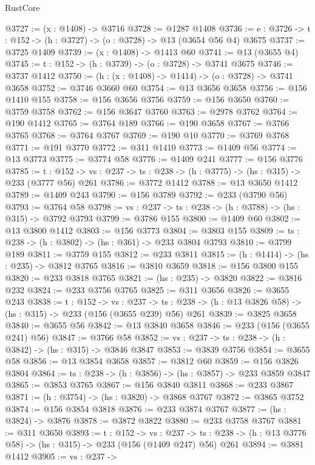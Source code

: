 \begin{lexlean}{RustCore}
\begin{coremodule}
@3727 := (x : @1408) -> @3716
@3728 := @1287 @1408
@3736 := {e : @3726} -> {t : @152} -> (h : @3727) -> (o : @3728) -> @13 (@3654 @56 @4) @3675
@3737 := @3725 @1409
@3739 := (x : @1408) -> @1413 @60
@3741 := @13 (@3655 @4)
@3745 := {t : @152} -> (h : @3739) -> (o : @3728) -> @3741 @3675
@3746 := @3737 @1412
@3750 := (h : (x : @1408) -> @1414) -> (o : @3728) -> @3741 @3658
@3752 := @3746 @3660 @60
@3754 := @13 @3656 @3658
@3756 := @156 @1410 @155
@3758 := @156 @3656 @3756
@3759 := @156 @3650
@3760 := @3759 @3758
@3762 := @156 @3647 @3760
@3763 := @2978 @3762
@3764 := @190 @1412
@3765 := @3764 @189
@3766 := @190 @3658
@3767 := @3766 @3765
@3768 := @3764 @3767
@3769 := @190 @10
@3770 := @3769 @3768
@3771 := @191 @3770
@3772 := @311 @1410
@3773 := @1409 @56
@3774 := @13 @3773
@3775 := @3774 @58
@3776 := @1409 @241
@3777 := @156 @3776
@3785 := {t : @152} ->
  {vs : @237} -> {ts : @238} -> (h : @3775) -> (hs : @315) -> @233 (@3777 @56) @261
@3786 := @3772 @1412
@3788 := @13 @3650 @1412
@3789 := @1409 @243
@3790 := @156 @3789
@3792 := @233 (@3790 @56)
@3793 := @3764 @58
@3798 := {vs : @237} -> {ts : @238} -> (h : @3788) -> (hs : @315) -> @3792 @3793
@3799 := @3786 @155
@3800 := @1409 @60
@3802 := @13 @3800 @1412
@3803 := @156 @3773
@3804 := @3803 @155
@3809 := {ts : @238} -> (h : @3802) -> (hs : @361) -> @233 @3804 @3793
@3810 := @3799 @189
@3811 := @3759 @155
@3812 := @233 @3811
@3815 := (h : @1414) -> (hs : @235) -> @3812 @3765
@3816 := @3810 @3659
@3818 := @156 @3800 @155
@3820 := @233 @3818 @3765
@3821 := (hs : @235) -> @3820
@3822 := @3816 @232
@3824 := @233 @3756 @3765
@3825 := @311 @3656
@3826 := @3655 @243
@3838 := {t : @152} ->
  {vs : @237} ->
  {ts : @238} -> (h : @13 @3826 @58) -> (hs : @315) -> @233 (@156 (@3655 @239) @56) @261
@3839 := @3825 @3658
@3840 := @3655 @56
@3842 := @13 @3840 @3658
@3846 := @233 (@156 (@3655 @241) @56)
@3847 := @3766 @58
@3852 := {vs : @237} -> {ts : @238} -> (h : @3842) -> (hs : @315) -> @3846 @3847
@3853 := @3839 @3756
@3854 := @3655 @58
@3856 := @13 @3854 @3658
@3857 := @3812 @60
@3859 := @156 @3826 @3804
@3864 := {ts : @238} -> (h : @3856) -> (hs : @3857) -> @233 @3859 @3847
@3865 := @3853 @3765
@3867 := @156 @3840 @3811
@3868 := @233 @3867
@3871 := (h : @3754) -> (hs : @3820) -> @3868 @3767
@3872 := @3865 @3752
@3874 := @156 @3854 @3818
@3876 := @233 @3874 @3767
@3877 := (hs : @3824) -> @3876
@3878 := @3872 @3822
@3880 := @233 @3758 @3767
@3881 := @311 @3650
@3893 := {t : @152} ->
  {vs : @237} ->
  {ts : @238} -> (h : @13 @3776 @58) -> (hs : @315) -> @233 (@156 (@1409 @247) @56) @261
@3894 := @3881 @1412
@3905 := {vs : @237} ->

\end{coremodule}
\end{lexlean}
